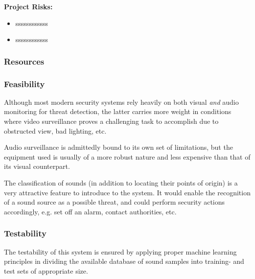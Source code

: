 \documentclass[a4paper,12pt]{article}
\numberwithin{equation}{section}
\numberwithin{figure}{section}
\numberwithin{table}{section}
\begin{document}
\textbf{Project Risks:}
\begin{itemize}
    \item ssssssssssss
    \item ssssssssssss
\end{itemize}



\subsubsection{Resources} %

\subsubsection{Feasibility} %


Although most modern security systems rely heavily on both visual \textit{and} audio monitoring for threat detection, the latter carries more weight in conditions where video surveillance proves a challenging task to accomplish due to obstructed view, bad lighting, etc.

Audio surveillance is admittedly bound to its own set of limitations, but the equipment used is usually of a more robust nature and less expensive than that of its visual counterpart.

The classification of sounds (in addition to locating their points of origin) is a very attractive feature to introduce to the system. It would enable the recognition of a sound source as a possible threat, and could perform security actions accordingly, e.g. set off an alarm, contact authorities, etc.

\subsubsection{Testability}
The testability of this system is ensured by applying proper machine learning principles in dividing the available database of sound samples into training- and test sets of appropriate size.

\end{document}
